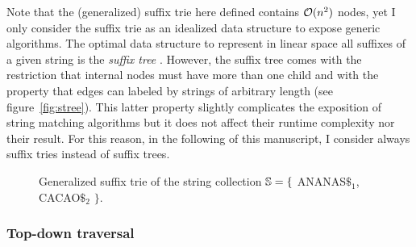 Note that the (generalized) suffix trie here defined contains $\mathcal{O}(n^2)$ nodes, yet I only consider the suffix trie as an idealized data structure to expose generic algorithms.
The optimal data structure to represent in linear space all suffixes of a given string is the \emph{suffix tree} \citep{Morrison1968}.
However, the suffix tree comes with the restriction that internal nodes must have more than one child and with the property that edges can labeled by strings of arbitrary length (see figure~\ref{fig:stree}).
This latter property slightly complicates the exposition of string matching algorithms but it does not affect their runtime complexity nor their result.
For this reason, in the following of this manuscript, I consider \wlogs always suffix tries instead of suffix trees.

\begin{figure}[h]
\caption[Example of suffix trie and suffix tree]{Suffix trie and suffix tree of the string {\ttfamily ANANAS\$} .}
\label{fig:stree}
\begin{subfigure}{.5\textwidth}
\begin{center}

\end{center}
\end{subfigure}%
\begin{subfigure}{.5\textwidth}
\begin{center}

\end{center}
\end{subfigure}
\end{figure}

\begin{figure}[h]
\caption[Example of generalized suffix trie]{Generalized suffix trie of the string collection $\mathbb {S} = \{$ {\ttfamily ANANAS$\$_1$}, {\ttfamily CACAO$\$_2$} $\}$.}
\label{fig:gstrie}
\begin{center}

\end{center}
\end{figure}

\subsubsection{Top-down traversal}

